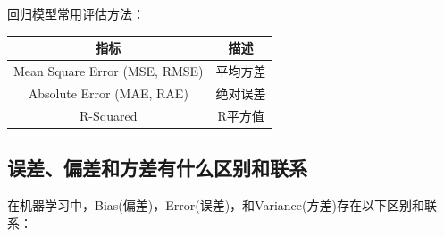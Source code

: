 回归模型常用评估方法：

\begin{table}[h]
	\centering
	\begin{tabular}{|c|c|}\hline
		指标 & 描述 \\\hline
		Mean Square Error (MSE, RMSE) & 平均方差 \\\hline
		Absolute Error (MAE, RAE) & 绝对误差 \\\hline
		R-Squared & R平方值 \\\hline
	\end{tabular}
\end{table}

\subsection{误差、偏差和方差有什么区别和联系}

在机器学习中，Bias(偏差)，Error(误差)，和Variance(方差)存在以下区别和联系：

